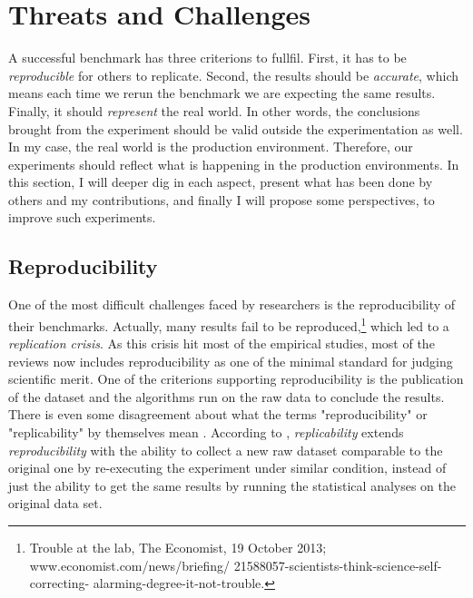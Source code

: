 \section{Threats and Challenges}
A successful benchmark has three criterions to fullfil.
First, it has to be \emph{reproducible} for others to replicate.
Second, the results should be \emph{accurate}, which means each time we rerun the benchmark we are expecting the same results.
Finally, it should \emph{represent} the real world.
In other words, the conclusions brought from the experiment should be valid outside the experimentation as well.
In my case, the real world is the production environment.
Therefore, our experiments should reflect what is happening in the production environments.
In this section, I will deeper dig in each aspect, present what has been done by others and my contributions, and finally I will propose some perspectives, to improve such experiments.



\subsection{Reproducibility}
One of the most difficult challenges faced by researchers is the reproducibility of their benchmarks.
Actually, many results fail to be reproduced,\footnote{Trouble at the lab, The Economist, 19 October 2013;  www.economist.com/news/briefing/ 21588057-scientists-think-science-self-correcting- alarming-degree-it-not-trouble.} which led to a \emph{replication crisis}.
As this crisis hit most of the empirical studies, most of the reviews now includes reproducibility as one of the minimal standard for judging scientific merit.\cite{peng2011reproducible}
One of the criterions supporting reproducibility is the publication of the dataset and the algorithms run on the raw data to conclude the results.
There is even some disagreement about what the terms "reproducibility" or "replicability" by themselves mean \cite{goodman2016does}.
According to \cite{echtler2018open}, \emph{replicability} extends \emph{reproducibility} with the ability to collect a new raw dataset comparable to the original one by re-executing the experiment under similar condition, instead of just the ability to get the same results by running the statistical analyses on the original data set.

